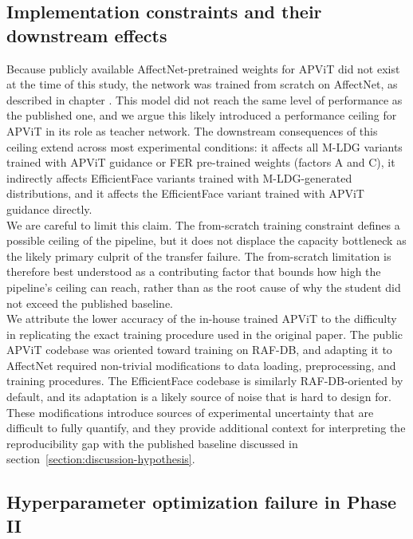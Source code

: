 \subsection{Implementation constraints and their downstream effects}
\label{section:discussion-implementation-constraints}

Because publicly available AffectNet-pretrained weights for APViT \cite{apvit2023} did not exist at the time of this study, the network was trained from scratch on AffectNet, as described in chapter . This model did not reach the same level of performance as the published one, and we argue this likely introduced a performance ceiling for APViT in its role as teacher network. The downstream consequences of this ceiling extend across most experimental conditions: it affects all M-LDG variants trained with APViT guidance or FER pre-trained weights (factors A and C), it indirectly affects EfficientFace variants trained with M-LDG-generated distributions, and it affects the EfficientFace variant trained with APViT guidance directly.\\

We are careful to limit this claim. The from-scratch training constraint defines a possible ceiling of the pipeline, but it does not displace the capacity bottleneck as the likely primary culprit of the transfer failure. The from-scratch limitation is therefore best understood as a contributing factor that bounds how high the pipeline's ceiling can reach, rather than as the root cause of why the student did not exceed the published baseline.\\

We attribute the lower accuracy of the in-house trained APViT to the difficulty in replicating the exact training procedure used in the original paper. The public APViT codebase \cite{apvit2023} was oriented toward training on RAF-DB, and adapting it to AffectNet required non-trivial modifications to data loading, preprocessing, and training procedures. The EfficientFace codebase \cite{eff-face2021} is similarly RAF-DB-oriented by default, and its adaptation is a likely source of noise that is hard to design for. These modifications introduce sources of experimental uncertainty that are difficult to fully quantify, and they provide additional context for interpreting the reproducibility gap with the published baseline discussed in section~\ref{section:discussion-hypothesis}.

\subsection{Hyperparameter optimization failure in Phase II}
\label{section:discussion-p2-hpo}

